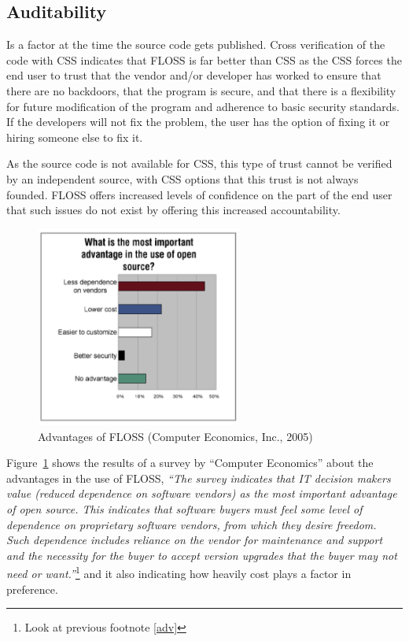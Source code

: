    \subsection {Auditability}
   
   Is a factor at the time the source code gets published. Cross verification of the code with  CSS indicates that FLOSS is far better than CSS as the CSS forces the end user to trust that the vendor and/or developer has worked to ensure that there are no backdoors, that the program is secure, and that there is a flexibility for future modification of the program and adherence to basic security standards. If the developers will not fix the problem, the user has the option of fixing it or hiring someone else to fix it. 
   
   As the source code is not available for CSS, this type of trust cannot be verified by an independent source, with CSS options that this trust is not always founded. FLOSS offers increased levels of confidence on the part of the end user that such issues do not exist by offering this increased accountability.
 \begin{figure}[H]
 	\centering
 	   \includegraphics[width=0.6\textwidth]{img/OSSadv.png}
 	  \caption[Advantages of FLOSS]{Advantages of FLOSS (Computer Economics, Inc., 2005)\protect \footnotemark }  
 	  \label{fig:OSSsdv}
 	 	\end{figure}
 
Figure~\ref{fig:OSSsdv} shows the results of a survey  by ``Computer Economics'' about the advantages in the use of FLOSS, \textit{``The survey indicates that IT decision makers value (reduced dependence on software vendors) as the most important advantage of open source.  This indicates that software buyers must feel some level of dependence on proprietary software vendors, from which they desire freedom.  Such dependence includes reliance on the vendor for maintenance and support and the necessity for the buyer to accept version upgrades that the buyer may not need or want.''}\footnote{Look at previous footnote \ref{adv}} and it also indicating how heavily cost plays a factor in preference.

